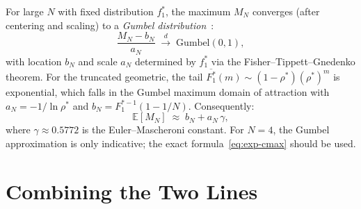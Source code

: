 \documentclass[11pt,a4paper]{report}
\newcommand{\rhostar}{\rho^{*}}
\begin{document}
For large $N$ with fixed distribution $f_1^*$, the maximum $M_N$
converges (after centering and scaling) to a \emph{Gumbel distribution}~\cite{gumbel1958,fisher_tippett1928}:
\begin{equation}
  \frac{M_N - b_N}{a_N} \;\xrightarrow{d}\; \mathrm{Gumbel}(0,1),
  \label{eq:gumbel}
\end{equation}
with location $b_N$ and scale $a_N$ determined by $f_1^*$ via the
Fisher--Tippett--Gnedenko theorem.
For the truncated geometric, the tail $\overline{F_1^*}(m) \sim (1-\rhostar)(\rhostar)^m$
is exponential, which falls in the Gumbel maximum domain of attraction
with $a_N = -1/\ln\rhostar$ and $b_N = F_1^{*-1}(1-1/N)$.
Consequently:
\begin{equation}
  \mathbb{E}[M_N] \;\approx\; b_N + a_N\,\gamma,
  \label{eq:gumbel-mean}
\end{equation}
where $\gamma \approx 0.5772$ is the Euler--Mascheroni constant.
For $N = 4$, the Gumbel approximation is only indicative;
the exact formula~\eqref{eq:exp-cmax} should be used.

\section{Combining the Two Lines}
\end{document}
